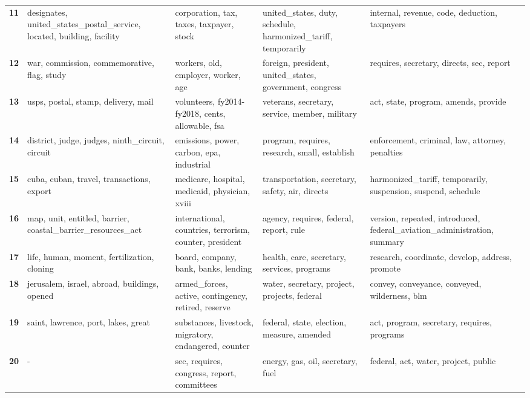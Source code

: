 \begin{xltabular}{\textwidth}{@{}l >{\RaggedRight\arraybackslash}X >{\RaggedRight\arraybackslash}X >{\RaggedRight\arraybackslash}X >{\RaggedRight\arraybackslash}X@{}}
    \textbf{11} & designates, united\_states\_postal\_service, located, building, facility & corporation, tax, taxes, taxpayer, stock & united\_states, duty, schedule, harmonized\_tariff, temporarily & internal, revenue, code, deduction, taxpayers \\
    \textbf{12} & war, commission, commemorative, flag, study & workers, old, employer, worker, age & foreign, president, united\_states, government, congress & requires, secretary, directs, sec, report \\
    \textbf{13} & usps, postal, stamp, delivery, mail & volunteers, fy2014-fy2018, cents, allowable, fsa & veterans, secretary, service, member, military & act, state, program, amends, provide \\
    \textbf{14} & district, judge, judges, ninth\_circuit, circuit & emissions, power, carbon, epa, industrial & program, requires, research, small, establish & enforcement, criminal, law, attorney, penalties \\
    \textbf{15} & cuba, cuban, travel, transactions, export & medicare, hospital, medicaid, physician, xviii & transportation, secretary, safety, air, directs & harmonized\_tariff, temporarily, suspension, suspend, schedule \\
    \textbf{16} & map, unit, entitled, barrier, coastal\_barrier\_resources\_act & international, countries, terrorism, counter, president & agency, requires, federal, report, rule & version, repeated, introduced, federal\_aviation\_administration, summary \\
    \textbf{17} & life, human, moment, fertilization, cloning & board, company, bank, banks, lending & health, care, secretary, services, programs & research, coordinate, develop, address, promote \\
    \textbf{18} & jerusalem, israel, abroad, buildings, opened & armed\_forces, active, contingency, retired, reserve & water, secretary, project, projects, federal & convey, conveyance, conveyed, wilderness, blm \\
    \textbf{19} & saint, lawrence, port, lakes, great & substances, livestock, migratory, endangered, counter & federal, state, election, measure, amended & act, program, secretary, requires, programs \\
    \textbf{20} & - & sec, requires, congress, report, committees & energy, gas, oil, secretary, fuel & federal, act, water, project, public \\
\end{xltabular}
\endgroup
